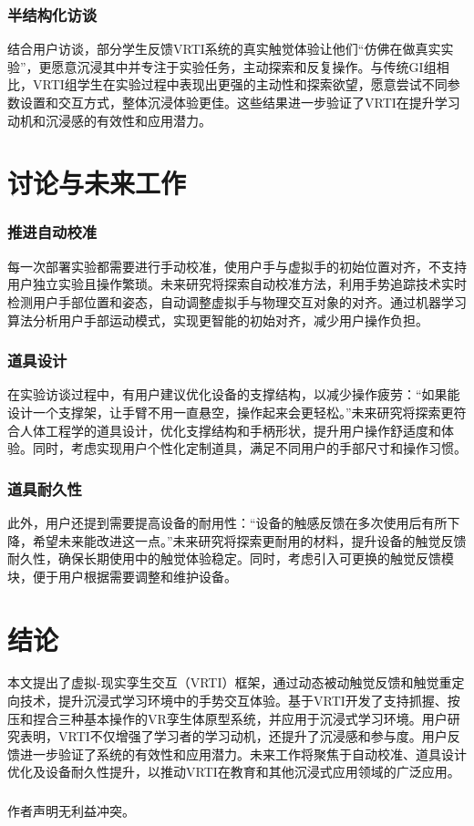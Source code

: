 \documentclass[runningheads]{llncs}
\begin{document}
\subsubsection{半结构化访谈}
结合用户访谈，部分学生反馈VRTI系统的真实触觉体验让他们“仿佛在做真实实验”，更愿意沉浸其中并专注于实验任务，主动探索和反复操作。与传统GI组相比，VRTI组学生在实验过程中表现出更强的主动性和探索欲望，愿意尝试不同参数设置和交互方式，整体沉浸体验更佳。这些结果进一步验证了VRTI在提升学习动机和沉浸感的有效性和应用潜力。

\section{讨论与未来工作}
\subsubsection{推进自动校准}
每一次部署实验都需要进行手动校准，使用户手与虚拟手的初始位置对齐，不支持用户独立实验且操作繁琐。未来研究将探索自动校准方法，利用手势追踪技术实时检测用户手部位置和姿态，自动调整虚拟手与物理交互对象的对齐。通过机器学习算法分析用户手部运动模式，实现更智能的初始对齐，减少用户操作负担。

\subsubsection{道具设计}
在实验访谈过程中，有用户建议优化设备的支撑结构，以减少操作疲劳：“如果能设计一个支撑架，让手臂不用一直悬空，操作起来会更轻松。”未来研究将探索更符合人体工程学的道具设计，优化支撑结构和手柄形状，提升用户操作舒适度和体验。同时，考虑实现用户个性化定制道具，满足不同用户的手部尺寸和操作习惯。

\subsubsection{道具耐久性}
此外，用户还提到需要提高设备的耐用性：“设备的触感反馈在多次使用后有所下降，希望未来能改进这一点。”未来研究将探索更耐用的材料，提升设备的触觉反馈耐久性，确保长期使用中的触觉体验稳定。同时，考虑引入可更换的触觉反馈模块，便于用户根据需要调整和维护设备。

\section{结论}
本文提出了虚拟-现实孪生交互（VRTI）框架，通过动态被动触觉反馈和触觉重定向技术，提升沉浸式学习环境中的手势交互体验。基于VRTI开发了支持抓握、按压和捏合三种基本操作的VR孪生体原型系统，并应用于沉浸式学习环境。用户研究表明，VRTI不仅增强了学习者的学习动机，还提升了沉浸感和参与度。用户反馈进一步验证了系统的有效性和应用潜力。未来工作将聚焦于自动校准、道具设计优化及设备耐久性提升，以推动VRTI在教育和其他沉浸式应用领域的广泛应用。

\begin{credits}
\subsubsection{\ackname} 

\subsubsection{\discintname}
作者声明无利益冲突。
\end{credits}


\end{document}
